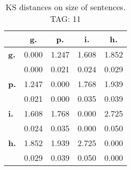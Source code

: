 \begin{table}[h!]
\begin{center}
\begin{tabular}{| l || c | c | c | c |}\hline
 & {\bf g.} & {\bf p.} & {\bf i.} & {\bf h.} \\\hline\hline
{\bf g.} & 0.000 & 1.247 & 1.608 & 1.852 \\
{\bf } & 0.000 & 0.021 & 0.024 & 0.029 \\\hline
{\bf p.} & 1.247 & 0.000 & 1.768 & 1.939 \\
{\bf } & 0.021 & 0.000 & 0.035 & 0.039 \\\hline
{\bf i.} & 1.608 & 1.768 & 0.000 & 2.725 \\
{\bf } & 0.024 & 0.035 & 0.000 & 0.050 \\\hline
{\bf h.} & 1.852 & 1.939 & 2.725 & 0.000 \\
{\bf } & 0.029 & 0.039 & 0.050 & 0.000 \\\hline
\end{tabular}
\caption{KS distances on size of sentences. TAG: 11}
\end{center}
\end{table}